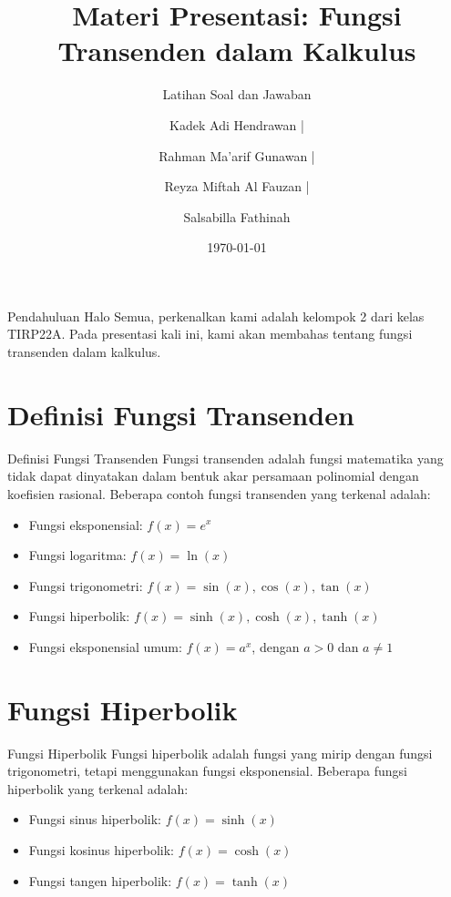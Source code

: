 \documentclass{beamer}
\title{Materi Presentasi: Fungsi Transenden dalam Kalkulus}
\subtitle{Latihan Soal dan Jawaban}
\author{Kadek Adi Hendrawan | \and Rahman Ma'arif Gunawan | \and Reyza Miftah Al Fauzan | \and Salsabilla Fathinah}
\institute{Sekolah Tinggi Teknologi Bandung}
\date{\today}
\begin{document}
\begin{frame}
  \titlepage
\end{frame}

\begin{frame}{Pendahuluan}
  Halo Semua, perkenalkan kami adalah kelompok 2 dari kelas TIRP22A. Pada presentasi kali ini, kami akan membahas tentang fungsi transenden dalam kalkulus.

  \vspace{12pt} %
\end{frame}

\section{Definisi Fungsi Transenden}

\begin{frame}{Definisi Fungsi Transenden}
  Fungsi transenden adalah fungsi matematika yang tidak dapat dinyatakan dalam bentuk akar persamaan polinomial dengan koefisien rasional. Beberapa contoh fungsi transenden yang terkenal adalah:

  \begin{itemize}
    \item Fungsi eksponensial: $f(x) = e^x$
    \item Fungsi logaritma: $f(x) = \ln(x)$
    \item Fungsi trigonometri: $f(x) = \sin(x), \cos(x), \tan(x)$
    \item Fungsi hiperbolik: $f(x) = \sinh(x), \cosh(x), \tanh(x)$
    \item Fungsi eksponensial umum: $f(x) = a^x$, dengan $a > 0$ dan $a \neq 1$
  \end{itemize}
\end{frame}

\section{Fungsi Hiperbolik}

\begin{frame}{Fungsi Hiperbolik}
  Fungsi hiperbolik adalah fungsi yang mirip dengan fungsi trigonometri, tetapi menggunakan fungsi eksponensial. Beberapa fungsi hiperbolik yang terkenal adalah:

  \begin{itemize}
    \item Fungsi sinus hiperbolik: $f(x) = \sinh(x)$
    \item Fungsi kosinus hiperbolik: $f(x) = \cosh(x)$
    \item Fungsi tangen hiperbolik: $f(x) = \tanh(x)$
  \end{itemize}
\end{frame}
\end{document}

